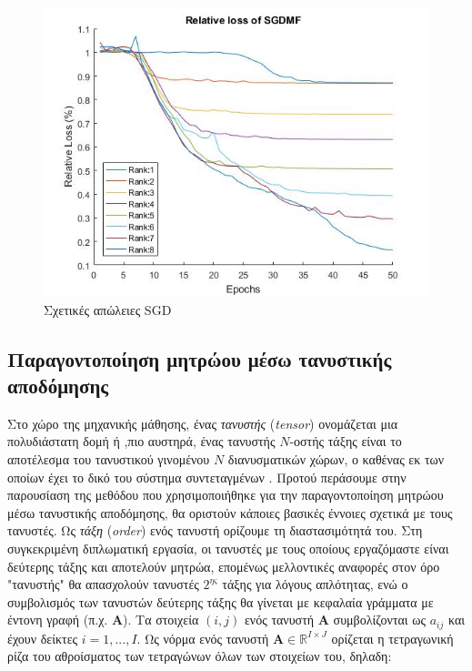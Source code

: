 \medskip
\begin{figure}[H]
  \centering
  \includegraphics[width=\textwidth]{images/SGDMFlosssmall.jpg}
  \caption{Σχετικές απώλειες SGD}
  \label{fig:SGDMFlosssmall}
\end{figure}


\medskip
\subsection{Παραγοντοποίηση μητρώου μέσω τανυστικής αποδόμησης}

Στο χώρο της μηχανικής μάθησης, ένας \textit{τανυστής} (\textit{tensor}) ονομάζεται μια πολυδιάστατη δομή ή ,πιο αυστηρά, ένας τανυστής $N$-οστής τάξης είναι το αποτέλεσμα του τανυστικού γινομένου $N$ διανυσματικών χώρων, ο καθένας εκ των οποίων έχει το δικό του σύστημα συντεταγμένων \cite{Kolda2009}. Προτού περάσουμε στην παρουσίαση της μεθόδου που χρησιμοποιήθηκε για την παραγοντοποίηση μητρώου μέσω τανυστικής αποδόμησης, θα οριστούν κάποιες βασικές έννοιες σχετικά με τους τανυστές. Ως \textit{τάξη} (\textit{order}) ενός τανυστή ορίζουμε τη διαστασιμότητά του. Στη συγκεκριμένη διπλωματική εργασία, οι τανυστές με τους οποίους εργαζόμαστε είναι δεύτερης τάξης και αποτελούν μητρώα, επομένως μελλοντικές αναφορές στον όρο "τανυστής" θα απασχολούν τανυστές $2^{ης}$ τάξης για λόγους απλότητας, ενώ ο συμβολισμός των τανυστών δεύτερης τάξης θα γίνεται με κεφαλαία γράμματα με έντονη γραφή (π.χ. $\textbf{A}$). Τα στοιχεία $(i,j)$ ενός τανυστή $\textbf{A}$ συμβολίζονται ως $a_{ij}$ και έχουν δείκτες $i = 1, ... , I$. Ως νόρμα ενός τανυστή {\Large $\textbf{A} \in \mathbb{R}^{I \times J }$ } ορίζεται η τετραγωνική ρίζα του αθροίσματος των τετραγώνων όλων των στοιχείων του, δηλαδη:


